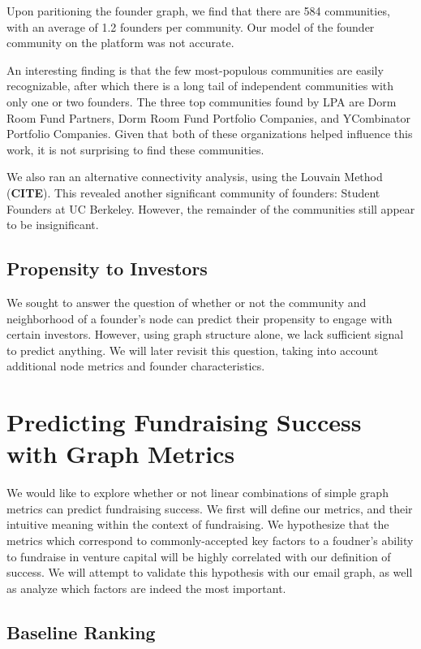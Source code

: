 Upon paritioning the founder graph, we find that there are 584 communities, with an average of 1.2 founders per community. Our model of the founder community on the platform was not accurate.

An interesting finding is that the few most-populous communities are easily recognizable, after which there is a long tail of independent communities with only one or two founders. The three top communities found by LPA are Dorm Room Fund Partners, Dorm Room Fund Portfolio Companies, and YCombinator Portfolio Companies. Given that both of these organizations helped influence this work, it is not surprising to find these communities.

We also ran an alternative connectivity analysis, using the Louvain Method (\textbf{CITE}). This revealed another significant community of founders: Student Founders at UC Berkeley. However, the remainder of the communities still appear to be insignificant.

\subsection{Propensity to Investors}

We sought to answer the question of whether or not the community and neighborhood of a founder's node can predict their propensity to engage with certain investors. However, using graph structure alone, we lack sufficient signal to predict anything. We will later revisit this question, taking into account additional node metrics and founder characteristics.

\section{Predicting Fundraising Success with Graph Metrics}

We would like to explore whether or not linear combinations of simple graph metrics can predict fundraising success. We first will define our metrics, and their intuitive meaning within the context of fundraising.  We hypothesize that the metrics which correspond to commonly-accepted key factors to a foudner's ability to fundraise in venture capital will be highly correlated with our definition of success. We will attempt to validate this hypothesis with our email graph, as well as analyze which factors are indeed the most important.

\subsection{Baseline Ranking}

